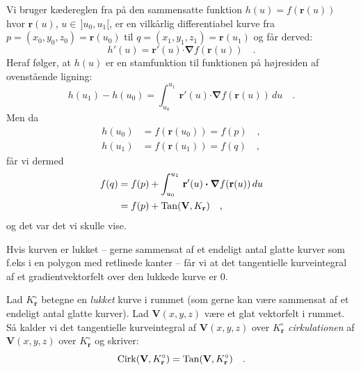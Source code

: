 \begin{bevis}
Vi bruger kædereglen fra  på den sammensatte funktion $h(u) = f(\mathbf{r}(u))$ hvor $\mathbf{r}(u)$, $u \in \, ]u_{0}, u_{1}[$,  er en vilkårlig differentiabel kurve fra $p= (x_{0}, y_{0}, z_{0}) = \mathbf{r}(u_{0})$ til $q=(x_{1}, y_{1}, z_{1}) = \mathbf{r}(u_{1})$ og får derved:
\begin{equation}
h'(u) = \mathbf{r}'(u) \bm{\cdot} {\bm{\nabla}}f(\mathbf{r}(u)) \quad .
\end{equation}
Heraf følger, at $h(u)$  er en stamfunktion til funktionen på højresiden af ovenstående ligning:
\begin{equation} \label{eqIntegChainregelA}
h(u_{1}) - h(u_{0}) = \int_{u_{0}}^{u_{1}} \, \mathbf{r}'(u) \bm{\cdot} {\bm{\nabla}}f(\mathbf{r}(u))\, du  \quad .
\end{equation}
Men da
\begin{equation}
\begin{aligned}
h(u_{0}) &= f(\mathbf{r}(u_{0})) = f(p) \quad , \\
h(u_{1}) &= f(\mathbf{r}(u_{1})) = f(q) \quad ,
\end{aligned}
\end{equation}
får vi dermed
\begin{equation} \label{eqIntegChainregel}
\begin{aligned}
 f(q) &= f(p) + \int_{u_{0}}^{u_{1}} \,  \mathbf{r}'(u) \bm{\cdot} {\bm{\nabla}}f(\mathbf{r}(u)) \, du \\
 &= f(p) + \operatorname{Tan}(\mathbf{V}, K_{\mathbf{r}})  \quad ,
 \end{aligned}
\end{equation}
og det var det vi skulle vise.
\end{bevis}

\begin{aha}
Hvis kurven er lukket -- gerne sammensat af et endeligt antal glatte kurver som f.eks i en polygon med retlinede kanter --
får vi at det tangentielle kurveintegral af et gradientvektorfelt over den lukkede kurve er $0$.
\end{aha}

\begin{definition}\label{defCirkulation}
Lad $K_{\mathbf{r}}^{\circ}$ betegne en  \emph{lukket} kurve i rummet (som gerne kan være sammensat af et endeligt antal glatte kurver). Lad $\mathbf{V}(x,y,z)$ være et glat vektorfelt i rummet. Så kalder vi det tangentielle kurveintegral af $\mathbf{V}(x,y,z)$ over $K_{\mathbf{r}}^{\circ}$ \emph{cirkulationen} af $\mathbf{V}(x,y,z)$ over $K_{\mathbf{r}}^{\circ}$ og skriver:
\begin{equation}
\operatorname{Cirk}({\bf V}, K_{\bf r}^{\circ}) = \operatorname{Tan}({\bf V}, K_{\bf r}^{\circ}) \quad .
\end{equation}
\end{definition}

